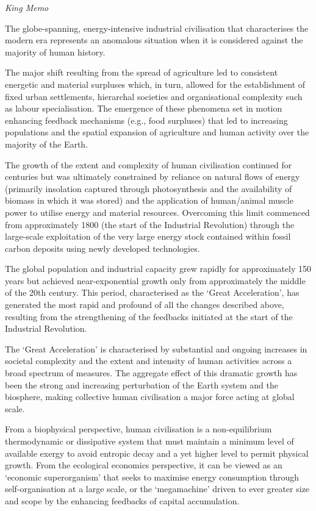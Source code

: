\documentclass[
]{book}
\begin{document}
\emph{King Memo}

The globe-spanning, energy-intensive industrial civilisation that characterises the
modern era represents an anomalous situation when it is considered against the majority
of human history.

The major shift resulting from the spread of agriculture led to consistent energetic and
material surpluses which, in turn, allowed for the establishment of fixed urban settlements,
hierarchal societies and organisational complexity such as labour specialisation. The
emergence of these phenomena set in motion enhancing feedback mechanisms (e.g., food
surpluses) that led to increasing populations and the spatial expansion of agriculture and
human activity over the majority of the Earth.

The growth of the extent and complexity
of human civilisation continued for centuries but was ultimately constrained by reliance
on natural flows of energy (primarily insolation captured through photosynthesis and
the availability of biomass in which it was stored) and the application of human/animal
muscle power to utilise energy and material resources. Overcoming this limit commenced
from approximately 1800 (the start of the Industrial Revolution) through the large-scale
exploitation of the very large energy stock contained within fossil carbon deposits using
newly developed technologies.

The global population and industrial capacity
grew rapidly for approximately 150 years but achieved near-exponential growth only
from approximately the middle of the 20th century. This period, characterised as the
`Great Acceleration', has generated the most rapid and profound of all the changes
described above, resulting from the strengthening of the feedbacks initiated at the start of
the Industrial Revolution.

The `Great Acceleration' is characterised by substantial and ongoing increases in
societal complexity and the extent and intensity of human activities across a broad spectrum
of measures.
The aggregate effect of this dramatic growth
has been the strong and increasing perturbation of the Earth system and the biosphere,
making collective human civilisation a major force acting at global scale.

From a biophysical perspective, human civilisation is a non-equilibrium thermodynamic
or dissipative system that must maintain a minimum level of available exergy
to avoid entropic decay and a yet higher level to permit physical growth. From the
ecological economics perspective, it can be viewed as an `economic superorganism' that
seeks to maximise energy consumption through self-organisation at a large scale, or the
`megamachine' driven to ever greater size and scope by the enhancing feedbacks of capital
accumulation.
\end{document}
